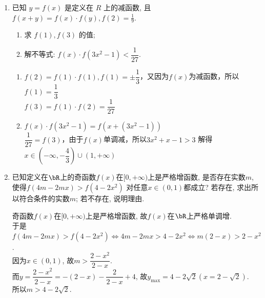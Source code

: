 \begin{enumerate}
\item 已知 $y=f(x)$ 是定义在 $R$ 上的减函数, 且 $f(x+y)=f(x) \cdot f(y), f(2)=\frac{1}{9}$.
\begin{enumerate}
    \item  求 $f(1) , f(3)$ 的值;
    \item 解不等式: $f(x) \cdot f\left(3 x^2-1\right)<\dfrac{1}{27}$.
\end{enumerate}
\begin{jieda}
    \begin{enumerate}
        \item $f(2) = f(1) \cdot f(1), f(1) = \pm \dfrac{1}{3}$，又因为$f(x)$为减函数，所以$f(1) = \dfrac{1}{3}$ \\ 
        $f(3) = f(1) \cdot f(2) = \dfrac{1}{27}$
        \item $f(x) \cdot f\left(3 x^2-1\right) = f(x+(3x^2-1)) $ \\
        $\dfrac{1}{27} = f(3)$，由于$f(x)$单调减，所以$3x^2 + x - 1 > 3$ 解得$x \in (-\infty, -\dfrac{4}{3}) \cup (1, +\infty)$
    \end{enumerate}
\end{jieda}
\begin{vspace_}
   \vsp[3] 
\end{vspace_}


\item 已知定义在$\bR$上的奇函数$f(x)$在$[0,+\infty)$上是严格增函数, 是否存在实数$m$, 使得$f(4m-2mx)>f(4-2x^2)$
对任意$x\in(0,1)$都成立? 若存在, 求出所以符合条件的实数$m$; 若不存在, 说明理由. 
\begin{jieda}
奇函数$f(x)$在$[0,+\infty)$上是严格增函数, 故$f(x)$在$\bR$上严格单调增. \\
于是$f(4m-2mx)>f(4-2x^2)\iff 4m-2mx>4-2x^2\iff m(2-x)>2-x^2$. \\
因为$x\in(0,1)$, 故$m>\dfrac{2-x^2}{2-x}$. \\
而$y=\dfrac{2-x^2}{2-x}=-(2-x)-\dfrac{2}{2-x}+4$, 故$y_{\max}=4-2\sqrt{2}(x=2-\sqrt{2})$. \\
所以$m>4-2\sqrt{2}$. 
\end{jieda}
\begin{vspace_}
   \vsp[4] 
\end{vspace_}




\end{enumerate}
